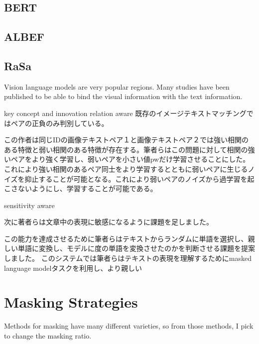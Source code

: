 \subsection{BERT}


\subsection{ALBEF}

\subsection{RaSa}

Vision language models are very popular regions. Many studies have been published to be able to bind the visual information with the text information. 

key concept and innovation
relation aware
既存のイメージテキストマッチングではペアの正負のみ判別している。


この作者は同じIDの画像テキストペア１と画像テキストペア２では強い相関のある特徴と弱い相関のある特徴が存在する。筆者らはこの問題に対して相関の強いペアをより強く学習し、弱いペアを小さい値pwだけ学習させることにした。これにより強い相関のあるペア同士をより学習するとともに弱いペアに生じるノイズを抑止することが可能となる。これにより弱いペアのノイズから過学習を起こさないようにし、学習することが可能である。

sensitivity aware

次に著者らは文章中の表現に敏感になるように課題を足しました。

この能力を達成させるために筆者らはテキストからランダムに単語を選択し、親しい単語に変換し、モデルに度の単語を変換させたのかを判断させる課題を提案しました。
このシステムでは筆者らはテキストの表現を理解するためにmasked language modelタスクを利用し、より親しい


\section{Masking Strategies}
Methods for masking have many different varieties, so from those methods, I pick to change the masking ratio.